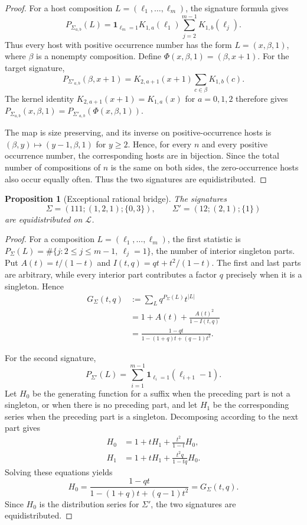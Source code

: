 \documentclass[12pt]{article}
\newtheorem{prop}[thm]{Proposition}
\newcommand{\cL}{\mathcal L}
\begin{document}
\begin{proof}
For a host composition $L=(\ell_1,\ldots,\ell_m)$, the signature formula
gives
\[
P_{\Sigma_{a,b}}(L)
=
\mathbf1_{\ell_m=1}
K_{1,a}(\ell_1)
\sum_{j=2}^{m-1}K_{1,b}(\ell_j).
\]
Thus every host with positive occurrence number has the form
$L=(x,\beta,1)$, where $\beta$ is a nonempty composition.  Define
$\Phi(x,\beta,1)=(\beta,x+1)$.
For the target signature,
\[
P_{\Sigma'_{a,b}}(\beta,x+1)
=
K_{2,a+1}(x+1)
\sum_{c\in\beta}K_{1,b}(c).
\]
The kernel identity $K_{2,a+1}(x+1)=K_{1,a}(x)$ for
$a=0,1,2$ therefore gives
$P_{\Sigma_{a,b}}(x,\beta,1)
=P_{\Sigma'_{a,b}}(\Phi(x,\beta,1))$.

The map is size preserving, and its inverse on positive-occurrence hosts is
$(\beta,y)\mapsto(y-1,\beta,1)$ for $y\ge2$.
Hence, for every $n$ and every positive occurrence number, the corresponding
hosts are in bijection.  Since the total number of compositions of $n$ is
the same on both sides, the zero-occurrence hosts also occur equally often.
Thus the two signatures are equidistributed.
\end{proof}

\begin{prop}[Exceptional rational bridge]
\label{prop:class79}
The signatures
\[
\Sigma=(111;(1,2,1);\{0,3\}),
\qquad
\Sigma'=(12;(2,1);\{1\})
\]
are equidistributed on $\cL$.
\end{prop}

\begin{proof}
For a composition $L=(\ell_1,\ldots,\ell_m)$, the first statistic is
$P_\Sigma(L)=\#\{j:2\le j\le m-1,\ \ell_j=1\}$, the number of interior
singleton parts.  Put $A(t)=t/(1-t)$ and
$I(t,q)=qt+t^2/(1-t)$.
The first and last parts are arbitrary, while every interior part contributes
a factor $q$ precisely when it is a singleton.  Hence
\[
\begin{aligned}
G_\Sigma(t,q)
&:=
\sum_{L}q^{P_\Sigma(L)}t^{|L|}\\
&=
1+A(t)+\frac{A(t)^2}{1-I(t,q)}\\
&=
\frac{1-qt}
{1-(1+q)t+(q-1)t^2}.
\end{aligned}
\]

For the second signature,
\[
P_{\Sigma'}(L)
=
\sum_{i=1}^{m-1}
\mathbf1_{\ell_i=1}(\ell_{i+1}-1).
\]
Let $H_0$ be the generating function for a suffix when the preceding part is
not a singleton, or when there is no preceding part, and let $H_1$ be the
corresponding series when the preceding part is a singleton.  Decomposing
according to the next part gives
\[
\begin{aligned}
H_0&=1+tH_1+\frac{t^2}{1-t}H_0,\\
H_1&=1+tH_1+\frac{t^2q}{1-tq}H_0.
\end{aligned}
\]
Solving these equations yields
\[
H_0
=
\frac{1-qt}
{1-(1+q)t+(q-1)t^2}
=
G_\Sigma(t,q).
\]
Since $H_0$ is the distribution series for $\Sigma'$, the two signatures are
equidistributed.
\end{proof}
\end{document}
